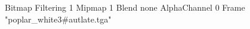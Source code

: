 {Bitmap
	{Filtering 1}
	{Mipmap 1}
	{Blend none}
	{AlphaChannel 0}
	{Frame "poplar_white3#autlate.tga"}
}
